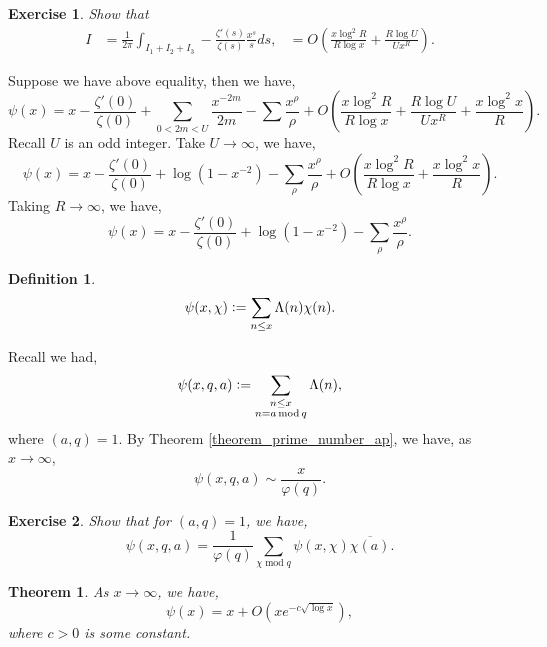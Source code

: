 \documentclass{article}
\newtheorem{theorem}{Theorem} [section]
\newtheorem{definition}{Definition}[section]
\newtheorem{exercise}{Exercise}[section]
\DeclareMathOperator{\tmod}{mod}
\newcommand{\defeq}{\vcentcolon=}
\begin{document}
\begin{exercise}
  Show that 
  \begin{align*}
    I &= {\frac 1 {2\pi}}\int_{I_1+I_2+I_3}-{\frac {\zeta'(s)}{\zeta(s)}}{\frac {x^s} {s}}ds,
    & = O\left({\frac {x\log^2 R}{R\log x}}+{\frac {R\log U}{Ux^R}}\right).
  \end{align*}
\end{exercise}
Suppose we have above equality, then we have,
\begin{equation*}
  \psi(x) = x-{\frac {\zeta'(0)} {\zeta(0)}}+\sum_{0<2m<U}{\frac {x^{-2m}} {2m}}-\sum{\frac {x^\rho} {\rho}}+O\left({\frac {x\log^2R}{R\log x}}+{\frac {R\log U} {Ux^R}}+{\frac {x\log^2x} R}\right).
\end{equation*}
Recall $U$ is an odd integer. Take $U\to\infty$, we have,
\begin{equation*}
  \psi(x) = x-{\frac {\zeta'(0)} {\zeta(0)}}+\log(1-x^{-2})-\sum_{\rho}{\frac {x^\rho} {\rho}}+O\left({\frac {x\log^2R}{R\log x}}+{\frac {x\log^2x} R}\right).
\end{equation*}
Taking $R\to\infty$, we have,
\begin{equation*}
  \psi(x) = x-{\frac {\zeta'(0)}{\zeta(0)}}+\log(1-x^{-2})-\sum_{\rho}{\frac {x^\rho} {\rho}}.
\end{equation*}
\begin{definition}
  \begin{equation*}
  \psi(x,\chi) \defeq\sum_{n\leq x}\Lambda(n)\chi(n).
  \end{equation*}
\end{definition}
Recall we had,
\begin{equation*}
\psi(x,q,a) \defeq\sum_{\substack{n\leq x\\n=a\tmod q}}\Lambda(n),
\end{equation*}
where $(a,q) = 1$. By Theorem \ref{theorem_prime_number_ap}, we have, as $x\to\infty$,
\begin{equation*}
\psi(x,q,a) \sim {\frac {x} {\varphi(q)}}.
\end{equation*}
\begin{exercise}
  Show that for $(a,q)=1$, we have,
  \begin{equation*}
    \psi(x,q,a) = {\frac 1 {\varphi(q)}}\sum_{\chi\tmod q}\psi(x,\chi)\overline{\chi(a)}.
  \end{equation*}
\end{exercise}
\begin{theorem}
  As $x\to\infty$, we have,
  \begin{equation*}
    \psi(x) = x+O(xe^{-c\sqrt{\log x}}),
  \end{equation*}
  where $c>0$ is some constant.
\end{theorem}
\end{document}
